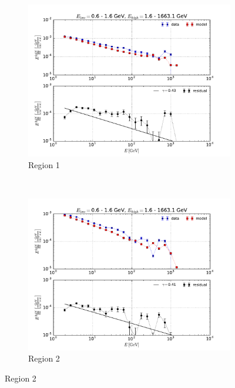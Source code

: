 \documentclass[a4paper]{article}
\begin{document}
\begin{figure}[h]
{\begin{subfigure}[b]{.65\textwidth}
		\includegraphics[width=.95\textwidth]{Res_SED_b=(-6,-2)_l=(-10,5)_1.pdf}
		\caption{Region 1}
	\end{subfigure}\
	\begin{subfigure}[b]{.65\textwidth}
		\centering
		\includegraphics[width=.95\textwidth]{Res_SED_b=(-10,-6)_l=(-15,10)_2.pdf}
		\caption{Region 2}
	\end{subfigure}
	}
\end{figure}
\end{document}
